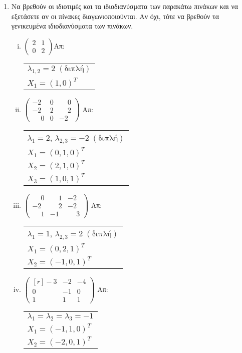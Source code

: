 \begin{enumerate}
\begin{enumerate}[i)]
\end{enumerate}

\item Να βρεθούν οι ιδιοτιμές και τα ιδιοδιανύσματα των παρακάτω πινάκων 
  και να εξετάσετε αν οι πίνακες διαγωνιοποιούνται. Αν όχι, τότε να βρεθούν τα 
  γενικευμένα ιδιοδιανύσματα των πινάκων.

\begin{enumerate}[i)]

\item $\begin{pmatrix}
2 & 1 \\
0 & 2
\end{pmatrix}$\hfill Απ: \begin{tabular}{l}
$\lambda_{1,2}=2 \; (\text{διπλή})$ \\
$X_1=(1,0)^T$ \\
\end{tabular}

\item $\begin{pmatrix}
-2 & 0 & \phantom{-}0 \\
-2 & 2 & \phantom{-}2 \\
\phantom{-}0 & 0 & -2
\end{pmatrix}$ \hfill Απ: \begin{tabular}{l}
$\lambda_1=2$, $\lambda_{2,3}=-2 \; (\text{διπλή})$ \\ 
$X_1=(0,1,0)^T$ \\
$X_2=(2,1,0)^T$ \\
$X_3=(1,0,1)^T$
\end{tabular}



\item $\begin{pmatrix}
\phantom{-}0 & \phantom{-}1 & -2 \\
-2 & \phantom{-}2 & -2 \\
\phantom{-}1 & -1 & \phantom{-}3
\end{pmatrix}$ \hfill Απ: \begin{tabular}{l}
$\lambda_1=1$, $\lambda_{2,3}=2 \; (\text{διπλή})$ \\ 
$X_1=(0,2,1)^T$ \\
$X_2=(-1,0,1)^T$ \\
\end{tabular}

\item $ \begin{pmatrix*}[r]
		-3 & -2 & -4 \\
		0 & -1 & 0 \\
		1 & 1 & 1 
\end{pmatrix*}$ \hfill Απ: \begin{tabular}{l}
$ \lambda_{1} = \lambda_{2} = \lambda_{3} = -1 $ \\
$ X_{1} = (-1,1,0)^T$ \\
$ X_{2} = (-2,0,1)^{T} $
\end{tabular}


\end{enumerate}
\end{enumerate}
